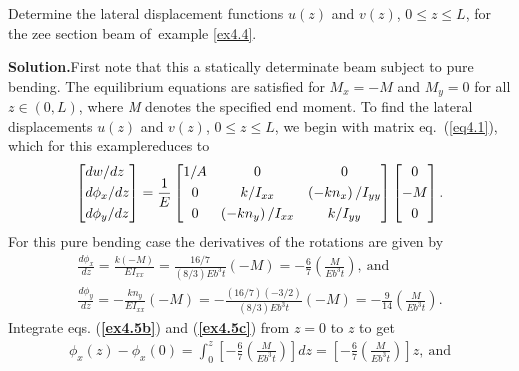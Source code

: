 \documentclass{AeroStructure-ERJohnson}
\begin{document}
\begin{example}\label{ex4.5}\setcounter{equation}{0}\def\theequation{\alph{equation}}%
Determine the lateral displacement functions $u(z)$ and $v(z)$, $0 \leq z \leq L$, for the zee section beam of~ex\-ample \ref{ex4.4}.

\noindent\textbf{Solution.}\enspace First note that this a statically determinate beam subject to pure bending. The equilibrium equations are satisfied for $M_{x}=-M$ and $M_{y}=0$ for all $z \in(0, L)$, where \textit{M} denotes the specified end moment. To find the lateral displacements $u(z)$ and $v(z)$, $0 \leq z \leq L$, we begin with matrix eq.~(\ref{eq4.1}), which for this example\break reduces\vspace*{10pt} to\pagebreak
\begin{align}\label{ex4.5a}
\left[\begin{array}{@{}l@{}}d w/d z \\[3pt]d \phi_{x}/d z \\[3pt]d \phi_{y}/d z\end{array}\right]=\frac{1}{E}\left[\begin{array}{@{}ccc@{}}1/A & 0 & 0 \\[3pt]0 & k/I_{x x} & \left(-k n_{x}\right)/I_{y y} \\[3pt]0 & \left(-k n_{y}\right)/I_{x x} & k/I_{y y}\end{array}\right]\left[\begin{array}{@{}c@{}}0 \\[3pt]-M \\[3pt]0\end{array}\right].
\end{align}
For this pure bending case the derivatives of the rotations are given by
\begin{gather}
\frac{d \phi_{x}}{d z}=\frac{k(-M)}{E I_{x x}}=\frac{16/7}{(8/3) E b^{3} t}(-M)=-\frac{6}{7}\left(\frac{M}{E b^{3} t}\right),\ \text{and}\label{ex4.5b}\\[6pt]
\frac{d \phi_{y}}{d z}=-\frac{k n_{y}}{E I_{x x}}(-M)=-\frac{(16/7)(-3/2)}{(8/3) E b^{3} t}(-M)=-\frac{9}{14}\left(\frac{M}{E b^{3} t}\right).\label{ex4.5c}
\end{gather}
Integrate eqs. (\textbf{\ref{ex4.5b}}) and (\textbf{\ref{ex4.5c}}) from $z = 0$ to $z$ to get
\begin{gather}
\phi_{x}(z)-\phi_{x}(0)=\int_{0}^{z}\left[-\frac{6}{7}\left(\frac{M}{E b^{3} t}\right)\right] d z=\left[-\frac{6}{7}\left(\frac{M}{E b^{3} t}\right)\right] z,\ \text{and}\label{ex4.5d}\\[6pt]

\end{gather}
\end{example}
\end{document}

